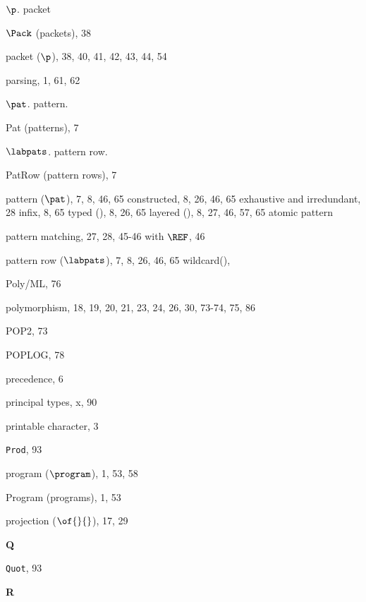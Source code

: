 \begin{theindex}
\item $\p$. \see packet
\item $\Pack$ (packets), 38
\item packet ($\p$), 38, 40, 41, 42, 43, 44, 54
\item parsing, 1, 61, 62
\item $\pat$. \see pattern.
\item Pat (patterns), 7
\item $\labpats$. \see pattern row.
\item PatRow (pattern rows), 7
\item pattern ($\pat$), 7, 8, 46, 65
\subitem constructed, 8, 26, 46, 65
\subitem exhaustive and irredundant, 28
\subitem infix, 8, 65
\subitem typed (\boxml{:}), 8, 26, 65
\subitem layered (), 8, 27, 46, 57, 65
\subitem \seealso atomic pattern
\item pattern matching, 27, 28, 45-46
\subitem with $\REF$, 46
\item pattern row ($\labpats$), 7, 8, 26, 46, 65
\subitem wildcard(), \dotdotdotrefs
\item Poly/ML, 76
\item polymorphism, 18, 19, 20, 21, 23, 24, 26, 30, 73-74, 75, 86
\item POP2, 73
\item POPLOG, 78
\item precedence, 6
\item principal types, x, 90
\item printable character, 3
\item {\tt Prod}, 93
\item program ($\program$), 1, 53, 58
\item Program (programs), 1, 53
\item projection ($\of{}{}$), 17, 29
\indexspace

\parbox{65mm}{\hfil{\large\bf Q}\hfil}

\indexspace

\item {\tt Quot}, 93
\indexspace

\parbox{65mm}{\hfil{\large\bf R}\hfil}

\indexspace


\end{theindex}
